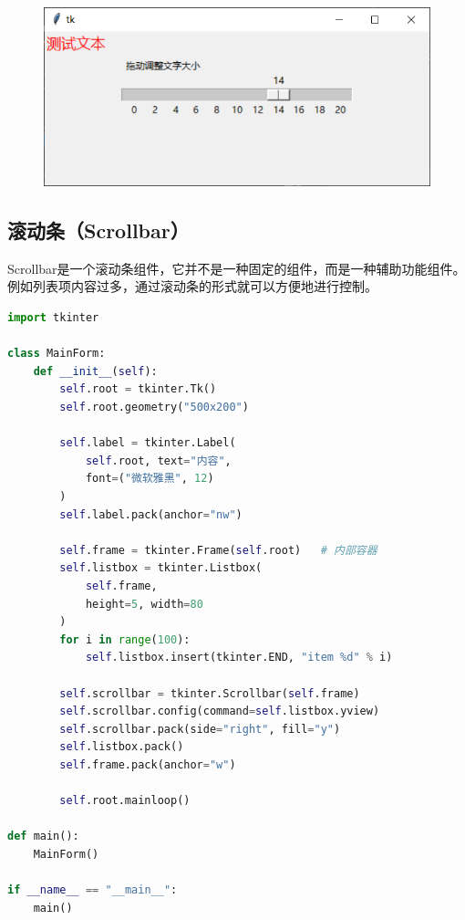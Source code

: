 \begin{tcolorbox}
	\begin{figure}[H]
		\centering
		\includegraphics[]{img/C13/13-4/4.png}
	\end{figure}
\end{tcolorbox}

\vspace{0.5cm}

\subsection{滚动条（Scrollbar）}

Scrollbar是一个滚动条组件，它并不是一种固定的组件，而是一种辅助功能组件。例如列表项内容过多，通过滚动条的形式就可以方便地进行控制。\\


\begin{lstlisting}[language=Python]
import tkinter

class MainForm:
    def __init__(self):
        self.root = tkinter.Tk()
        self.root.geometry("500x200")

        self.label = tkinter.Label(
            self.root, text="内容",
            font=("微软雅黑", 12)
        )
        self.label.pack(anchor="nw")

        self.frame = tkinter.Frame(self.root)   # 内部容器
        self.listbox = tkinter.Listbox(
            self.frame,
            height=5, width=80
        )
        for i in range(100):
            self.listbox.insert(tkinter.END, "item %d" % i)
        
        self.scrollbar = tkinter.Scrollbar(self.frame)
        self.scrollbar.config(command=self.listbox.yview)
        self.scrollbar.pack(side="right", fill="y")
        self.listbox.pack()
        self.frame.pack(anchor="w")

        self.root.mainloop()

def main():
    MainForm()

if __name__ == "__main__":
    main()
\end{lstlisting}

